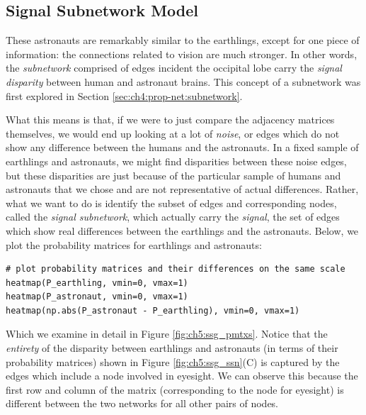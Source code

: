 \subsection{Signal Subnetwork Model}

These astronauts are remarkably similar to the earthlings, except for one piece of information: the connections related to vision are much stronger. In other words, the \textit{subnetwork} comprised of edges incident the occipital lobe carry the \textit{signal disparity} between human and astronaut brains. This concept of a subnetwork was first explored in Section \ref{sec:ch4:prop-net:subnetwork}. 

What this means is that, if we were to just compare the adjacency matrices themselves, we would end up looking at a lot of \textit{noise}, or edges which do not show any difference between the humans and the astronauts. In a fixed sample of earthlings and astronauts, we might find disparities between these noise edges, but these disparities are just because of the particular sample of humans and astronauts that we chose and are not representative of actual differences. Rather, what we want to do is identify the subset of edges and corresponding nodes, called the \textit{signal subnetwork}, which actually carry the \textit{signal}, the set of edges which show real differences between the earthlings and the astronauts. Below, we plot the probability matrices for earthlings and astronauts:

\begin{lstlisting}[style=python]
# plot probability matrices and their differences on the same scale
heatmap(P_earthling, vmin=0, vmax=1)
heatmap(P_astronaut, vmin=0, vmax=1)
heatmap(np.abs(P_astronaut - P_earthling), vmin=0, vmax=1)
\end{lstlisting}

Which we examine in detail in Figure \ref{fig:ch5:ssg_pmtxs}. Notice that the \textit{entirety} of the disparity between earthlings and astronauts (in terms of their probability matrices) shown in Figure \ref{fig:ch5:ssg_ssn}(C) is captured by the edges which include a node involved in eyesight. We can observe this because the first row and column of the matrix (corresponding to the node for eyesight) is different between the two networks for all other pairs of nodes.

